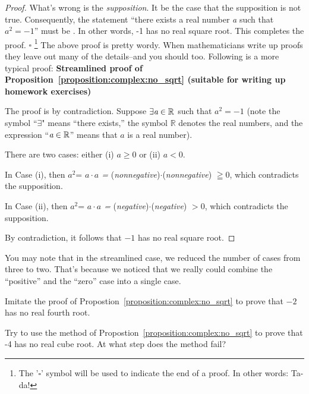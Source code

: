 \begin{proof}
What's wrong is the \emph{supposition}. It  be the case that the supposition is not
true. Consequently, the statement ``there exists a real number
\emph{a} such that $a^{2}=-1$'' must be . In other
words, -1 has no real square root. This completes the proof. $\square$
\footnote{The '$\square$' symbol will be used to indicate the end of a proof. In other words: Ta-da!}
\medskip{}
\newline
The above proof is pretty wordy. When mathematicians write up proofs they leave out many of the details--and you should too. Following is a more typical proof:
\medskip{}
\newline
\noindent \textbf{Streamlined proof of Proposition~\ref{proposition:complex:no_sqrt} (suitable for writing up homework exercises)}

The proof is by contradiction. Suppose $\exists \emph{a} \in \mathbb{R}$
such that $a^{2}=-1$ (note the symbol ``$\exists$" means ``there exists,'' the symbol $\mathbb{R}$ denotes the real numbers, and the expression ``$\emph{a} \in \mathbb{R}$'' means that $a$ is a real number).

There are two cases: either (i) $a\geq0$ or (ii) $a<0$.

In Case (i), then $a^{2}$= \emph{$a\cdot a$ =} (\emph{nonnegative})$\cdot$(\emph{nonnegative})
$\geqq0$, which contradicts the supposition.

In Case (ii), then $a^{2}$= \emph{$a\cdot a$ =} (\emph{negative})$\cdot$(\emph{negative})
$>0$, which contradicts the supposition.

By contradiction, it follows that $-1$ has no real square root.
\end{proof}
You may note that in the streamlined case, we reduced the number of cases from three to two.  That's because we noticed that we really could combine the ``positive'' and the ``zero'' case into a single case.

\begin{exercise}\label{exercise:complex:root1}
 Imitate the proof of Propostion~\ref{proposition:complex:no_sqrt} to prove that $-2$ has no real fourth root.
\end{exercise}

\begin{exercise}\label{exercise:complex:root2}
Try to use the method of Propostion~\ref{proposition:complex:no_sqrt} to prove that -4 has no real cube root. At what step does the method fail?
\end{exercise}


